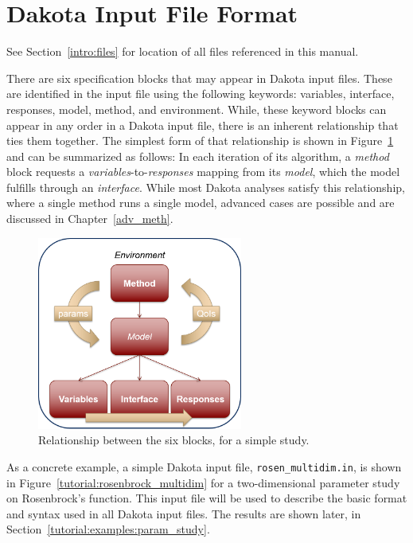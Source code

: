 \section{Dakota Input File Format}\label{tutorial:dakota}

See Section~\ref{intro:files} for location of all files referenced in this
manual.

There are six specification blocks that may appear in Dakota input
files. These are identified in the input file using the following
keywords: variables, interface, responses, model, method, and
environment. While, these keyword blocks can appear in any order in a
Dakota input file, there is an inherent relationship that ties them
together. The simplest form of that relationship is shown in
Figure~\ref{tutorial:inputfile_block_layout} and can be summarized as
follows: In each iteration of its algorithm, a \emph{method} block
requests a \emph{variables}-to-\emph{responses} mapping from its
\emph{model}, which the model fulfills through an \emph{interface}.
While most Dakota analyses satisfy this relationship, where a single
method runs a single model, advanced cases are possible and are
discussed in Chapter~\ref{adv_meth}.

\begin{figure}[ht!]
  \centering
  \includegraphics[height=2.5in]{images/InputBlocks}
  \caption{Relationship between the six blocks, for a simple study.}
  \label{tutorial:inputfile_block_layout}
\end{figure}

As a concrete example, a simple Dakota input file,
\texttt{rosen\_multidim.in}, is shown in
Figure~\ref{tutorial:rosenbrock_multidim} for a two-dimensional
parameter study on Rosenbrock's function.  This input file will be
used to describe the basic format and syntax used in all Dakota input
files.  The results are shown later, in
Section~\ref{tutorial:examples:param_study}.

